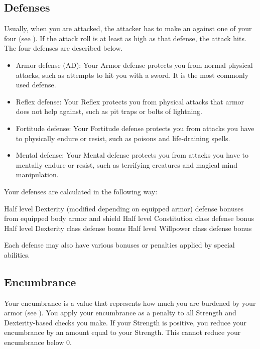     \subsection{Defenses}\label{Defenses}
        Usually, when you are attacked, the attacker has to make an  against one of your four  (see ).
        If the attack roll is at least as high as that defense, the attack hits.
        The four defenses are described below.
        \begin{itemize}
            \item Armor defense (AD): Your Armor defense protects you from normal physical attacks, such as attempts to hit you with a sword.
                It is the most commonly used defense.
            \item Reflex defense: Your Reflex protects you from physical attacks that armor does not help against, such as pit traps or bolts of lightning.
            \item Fortitude defense: Your Fortitude defense protects you from attacks you have to physically endure or resist, such as poisons and life-draining spells.
            \item Mental defense: Your Mental defense protects you from attacks you have to mentally endure or resist, such as terrifying creatures and magical mind manipulation.
        \end{itemize}

        Your defenses are calculated in the following way:
        \begin{itemize}
             Half level \add Dexterity (modified depending on equipped armor) \add defense bonuses from equipped body armor and shield
             Half level \add Constitution \add class defense bonus
             Half level \add Dexterity \add class defense bonus
             Half level \add Willpower \add class defense bonus
        \end{itemize}
        Each defense may also have various bonuses or penalties applied by special abilities.

    \subsection{Encumbrance}\label{Encumbrance}
        Your encumbrance is a value that represents how much you are burdened by your armor (see ).
        You apply your encumbrance as a penalty to all Strength and Dexterity-based checks you make.
        If your Strength is positive, you reduce your encumbrance by an amount equal to your Strength.
        This cannot reduce your encumbrance below 0.

